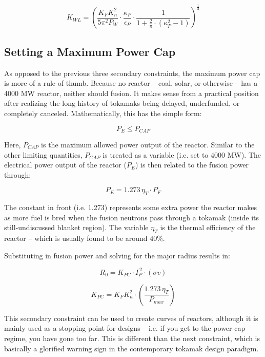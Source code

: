 \begin{equation}
	K_{WL} = \left( \frac{ K_F K_n^2 }{ 5 \pi^2 P_W } \cdot \frac{\kappa_P}{\epsilon_P} \cdot \frac{1}{1 + \frac{2}{\pi} \cdot ( \kappa_P^2 - 1 ) } \right) ^ { \frac{1}{3} }
\end{equation}

\subsection{Setting a Maximum Power Cap}

As opposed to the previous three secondary constraints, the maximum power cap is more of a rule of thumb. Because no reactor -- coal, solar, or otherwise -- has a 4000 MW reactor, neither should fusion. It makes sense from a practical position after realizing the long history of tokamaks being delayed, underfunded, or completely canceled. Mathematically, this has the simple form:

\begin{equation}
	P_E \le P_{CAP}
\end{equation}

Here, $P_{CAP}$ is the maximum allowed power output of the reactor. Similar to the other limiting quantities, $P_{CAP}$ is treated as a  variable (i.e. set to 4000 MW). The electrical power output of the reactor ($P_E$) is then related to the fusion power through: \cite{jeff}

\begin{equation}
	P_E = 1.273 \, \eta_T \cdot P_F
\end{equation}

The constant in front (i.e. 1.273) represents some extra power the reactor makes as more fuel is bred when the fusion neutrons pass through a tokamak (inside its still-undiscussed blanket region). The variable $\eta_T$ is the thermal efficiency of the reactor -- which is usually found to be around 40\%.

Substituting in fusion power and solving for the major radius results in:

\begin{equation}
	\label{eq:r_pcap}
	R_0 = K_{PC} \cdot I_P^{\,2} \cdot (\sigma v)
\end{equation}

\begin{equation}
	K_{PC} = K_F K_n^2 \cdot \left( \frac{ 1.273 \, \eta_T }{ P_{max} } \right)
\end{equation}

This secondary constraint can be used to create curves of reactors, although it is mainly used as a stopping point for designs -- i.e. if you get to the power-cap regime, you have gone too far. This is different than the next constraint, which is basically a glorified warning sign in the contemporary tokamak design paradigm.

